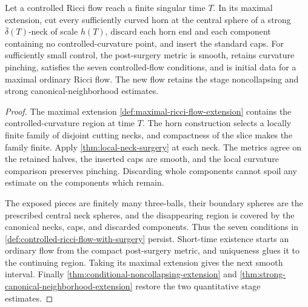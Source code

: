 \begin{lemma}
\label{lem:controlled-surgery-restart}
\notready
Let a controlled Ricci flow reach a finite singular time $T$.  In its maximal
extension, cut every sufficiently curved horn at the central sphere of a
strong $\bar\delta(T)$-neck of scale $h(T)$, discard each horn end and each
component containing no controlled-curvature point, and insert the standard
caps.  For sufficiently small control, the post-surgery metric is smooth,
retains curvature pinching, satisfies the seven controlled-flow conditions,
and is initial data for a maximal ordinary Ricci flow.  The new flow retains
the stage noncollapsing and strong canonical-neighborhood estimates.
\end{lemma}

\begin{proof}
The maximal extension \ref{def:maximal-ricci-flow-extension} contains the
controlled-curvature region at time $T$.  The horn construction selects a
locally finite family of disjoint cutting necks, and compactness of the slice
makes the family finite.  Apply \ref{thm:local-neck-surgery} at each neck.
The metrics agree on the retained halves, the inserted caps are smooth, and
the local curvature comparison preserves pinching.  Discarding whole
components cannot spoil any estimate on the components which remain.

The exposed pieces are finitely many three-balls, their boundary spheres are
the prescribed central neck spheres, and the disappearing region is covered
by the canonical necks, caps, and discarded components.  Thus the seven
conditions in \ref{def:controlled-ricci-flow-with-surgery} persist.  Short-time
existence starts an ordinary flow from the compact post-surgery metric, and
uniqueness glues it to the continuing region.  Taking its maximal extension
gives the next smooth interval.  Finally
\ref{thm:conditional-noncollapsing-extension} and
\ref{thm:strong-canonical-neighborhood-extension} restore the two quantitative
stage estimates.
\end{proof}

